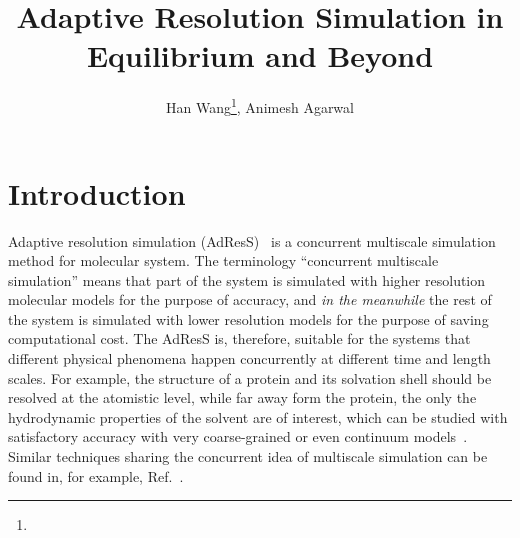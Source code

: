 \documentclass[epjST]{svjour}
\begin{document}
%
\title{Adaptive Resolution Simulation in Equilibrium and Beyond}
\author{Han Wang\fnmsep\thanks{}, Animesh Agarwal}
%
%
%
\maketitle
%

\section{Introduction}

Adaptive resolution simulation (AdResS)~\cite{praprotnik2005adaptive,praprotnik2006adaptive,praprotnik2007adaptive,praprotnik2008multiscale,poma2010classical,poblete2010coupling,praprotnik2011statistical,fritsch2012adaptive,bevc2013adaptive} is a concurrent multiscale simulation method for molecular system.
The terminology ``concurrent multiscale simulation'' means that
part of the system is simulated with higher resolution molecular models for the
purpose of accuracy, and \emph{in the meanwhile} the rest of the system is
simulated with lower resolution models for the purpose of saving computational cost.
The AdResS is, therefore, suitable for the systems that different physical
phenomena happen concurrently at different time and length scales. For example,
the structure of a protein and its solvation shell
should be resolved at the atomistic level, while far away form the protein,
the only the hydrodynamic properties of the solvent are of interest, which can be studied with satisfactory
accuracy with very coarse-grained or even continuum
models~\cite{zavadlav2014adaptive,zavadlav2014adaptive1,delgado2009coupling}.
Similar  
techniques sharing the concurrent idea of multiscale simulation can be found in, for example, Ref.~\cite{ensing2007energy,heyes2010thermodynamic,shi2006mixed,shen2014resolution,nielsen2010adaptive}.
\end{document}
